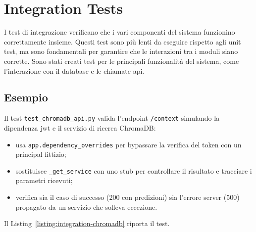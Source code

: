 \section{Integration Tests}
I test di integrazione verificano che i vari componenti del sistema funzionino correttamente insieme. Questi test sono più lenti da eseguire rispetto agli unit test, ma sono fondamentali per garantire che le interazioni tra i moduli siano corrette.
Sono stati creati test per le principali funzionalità del sistema, come l'interazione con il database e le chiamate \acrshort{api}.
\subsection{Esempio}
Il test \texttt{test\_chromadb\_api.py} valida l’endpoint \texttt{/context} simulando la dipendenza \acrshort{jwt} e il servizio di ricerca ChromaDB:
\begin{itemize}
    \item usa \texttt{app.dependency\_overrides} per bypassare la verifica del token con un principal fittizio;
    \item sostituisce \texttt{\_get\_service} con uno stub per controllare il risultato e tracciare i parametri ricevuti;
    \item verifica sia il caso di successo (200 con predizioni) sia l’errore server (500) propagato da un servizio che solleva eccezione.
\end{itemize}
Il Listing~\ref{listing:integration-chromadb} riporta il test.
\captionsetup{type=listing, belowskip=0pt}
\inputminted[fontsize=\small, breaklines, breakanywhere=true, linenos=true, bgcolor=gray!10]{python}{code/tests/test_chromadb_api.py}
\label{listing:integration-chromadb}

